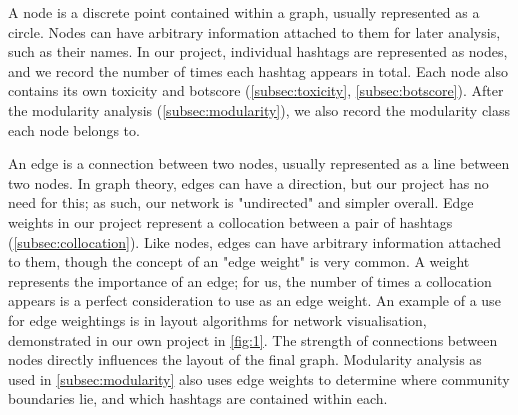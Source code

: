 \documentclass[a4paper,11pt]{article}  %
\begin{document}
\begin{appendices}
	A node is a discrete point contained within a graph, usually represented as a circle. Nodes can have arbitrary information attached to them for later analysis, such as their names. In our project, individual hashtags are represented as nodes, and we record the number of times each hashtag appears in total. Each node also contains its own toxicity and botscore (\autoref{subsec:toxicity}, \autoref{subsec:botscore}). After the modularity analysis (\autoref{subsec:modularity}), we also record the modularity class each node belongs to.
	
	An edge is a connection between two nodes, usually represented as a line between two nodes. In graph theory, edges can have a direction, but our project has no need for this; as such, our network is "undirected" and simpler overall. Edge weights in our project represent a collocation between a pair of hashtags (\autoref{subsec:collocation}). Like nodes, edges can have arbitrary information attached to them, though the concept of an "edge weight" is very common. A weight represents the importance of an edge; for us, the number of times a collocation appears is a perfect consideration to use as an edge weight. An example of a use for edge weightings is in layout algorithms for network visualisation, demonstrated in our own project in \autoref{fig:1}. The strength of connections between nodes directly influences the layout of the final graph. Modularity analysis as used in \autoref{subsec:modularity} also uses edge weights to determine where community boundaries lie, and which hashtags are contained within each.
	
	\end{appendices}
	
	\newpage
	\label{sec:references}
	\printbibliography
	
\end{document}
